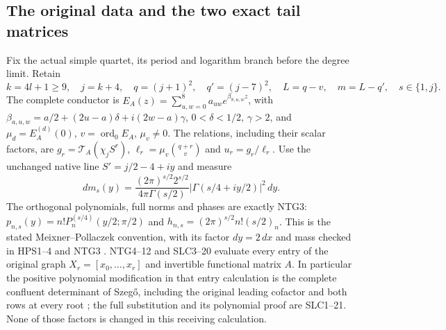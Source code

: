 \documentclass[11pt,a4paper]{article}
\begin{document}
\subsection{The original data and the two exact tail matrices}
Fix the actual simple quartet, its period and logarithm branch before
the degree limit. Retain
\[
 k=4l+1\ge9,\quad j=k+4,\quad q=(j+1)^2,\quad q'=(j-7)^2,
 \quad L=q-v,\quad m=L-q',\quad s\in\{1,j\}.                 \tag{FTR1}
\]
The complete conductor is
$E_A(z)=\sum_{u,w=0}^{8}a_{uw}e^{\beta_{8,u,w}z}$, with
$\beta_{a,u,w}=a/2+(2u-a)\delta+i(2w-a)\gamma$,
$0<\delta<1/2$, $\gamma>2$, and
$\mu_d=E_A^{(d)}(0)$, $v=\operatorname{ord}_0E_A$,
$\mu_v\ne0$. The relations, including their scalar factors, are
$g_r=\mathcal T_A(\chi_jS^r)$,
$\ell_r=\mu_v\binom{q+r}{v}$ and $u_r=g_r/\ell_r$.
Use the unchanged native line $S'=j/2-4+iy$ and measure
\[
 dm_s(y)=\frac{(2\pi)^{s/2}2^{s/2}}{4\pi\Gamma(s/2)}
             |\Gamma(s/4+iy/2)|^2\,dy .                  \tag{FTR2}
\]
The orthogonal polynomials, full norms and phases are exactly NTG3:
$p_{n,s}(y)=n!P_n^{(s/4)}(y/2;\pi/2)$ and
$h_{n,s}=(2\pi)^{s/2}n!(s/2)_n$. This is the stated
Meixner--Pollaczek convention, with its factor $dy=2\,dx$ and
mass checked in HPS1--4 and NTG3
\cite[eqs.~(18.19.8)--(18.19.9), (18.22.8)]{human:dlmf18}.
NTG4--12 and SLC3--20 evaluate every entry of the original graph
$X_r=[x_0,\ldots,x_r]$ and invertible functional matrix $A$.
In particular the positive polynomial modification in that entry
calculation is the complete confluent determinant of Szeg\H{o},
including the original leading cofactor and both rows at every root
\cite[Theorem 2.5, pp.~29--30]{human:szego1975}; the full substitution
and its polynomial proof are SLC1--21. None of those factors is changed
in this receiving calculation.
\end{document}
